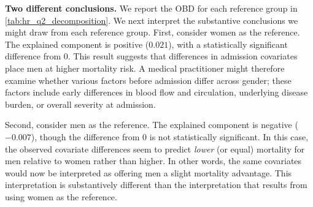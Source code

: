 \textbf{Two different conclusions.} 
We report the OBD for each reference group in \cref{tab:hr_q2_decomposition}. We next interpret the substantive conclusions
we might draw from each reference group. First, consider women as the reference. The explained component is positive ($0.021$), with a statistically significant difference from 0.
This result suggests that differences in admission covariates place men at higher mortality risk. A medical practitioner might therefore examine whether various factors before admission differ across gender; these factors include early differences in blood flow and circulation, underlying disease burden, or overall severity at admission.

Second, consider men as the reference. The explained component is negative ($-0.007$), though the difference from 0 is not statistically significant. In this case, the observed covariate differences seem to predict \emph{lower} (or equal) mortality for men relative to women rather than higher. In other words, the same covariates would now be interpreted as offering men a slight mortality advantage. This interpretation is substantively different than the interpretation that results from using women as the reference.



